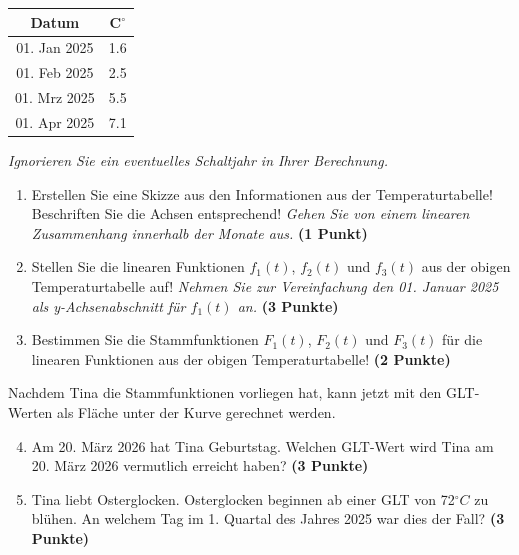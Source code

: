 \documentclass[a4paper, 9pt]{scrartcl}\usepackage[]{graphicx}\usepackage[]{xcolor}
\begin{document}
\begin{center}
\begin{tabular}{cc}
  \toprule
  Datum & C$^\circ$ \\
  \midrule
  01. Jan 2025 & 1.6\\
  01. Feb 2025 & 2.5\\
  01. Mrz 2025 & 5.5\\
  01. Apr 2025 & 7.1\\
  \bottomrule
\end{tabular}
\end{center}

\textit{Ignorieren Sie ein eventuelles Schaltjahr in Ihrer Berechnung.}

\begin{enumerate}
\item Erstellen Sie eine Skizze aus den Informationen aus der Temperaturtabelle! Beschriften Sie die Achsen entsprechend! \textit{Gehen Sie von einem linearen Zusammenhang innerhalb der Monate aus.} \textbf{(1 Punkt)}
\item Stellen Sie die linearen Funktionen $f_1(t)$, $f_2(t)$ und $f_3(t)$ aus der obigen Temperaturtabelle auf! \textit{Nehmen Sie zur Vereinfachung den 01. Januar 2025 als y-Achsenabschnitt für $f_1(t)$ an.}  \textbf{(3 Punkte)}
\item Bestimmen Sie die Stammfunktionen $F_1(t)$, $F_2(t)$ und $F_3(t)$ für die linearen Funktionen aus der obigen Temperaturtabelle!  \textbf{(2 Punkte)}
\end{enumerate}

Nachdem Tina die Stammfunktionen vorliegen hat, kann jetzt mit den GLT-Werten als Fläche unter der Kurve gerechnet werden. 

\begin{enumerate}
  \setcounter{enumi}{3} 
\item Am 20. März 2026 hat Tina Geburtstag. Welchen GLT-Wert wird Tina am 20. März 2026 vermutlich erreicht haben? \textbf{(3 Punkte)}
\item Tina liebt Osterglocken.  Osterglocken beginnen ab einer GLT von 72$^\circ C$ zu blühen. An welchem Tag im 1. Quartal des Jahres 2025 war dies der Fall?  \textbf{(3 Punkte)}
\end{enumerate}

\end{document}
